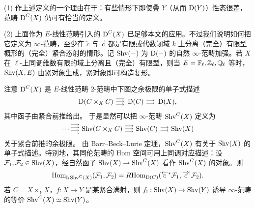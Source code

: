\begin{rmk}
\label{R: DC enh}
(1) 作上述定义的一个理由在于：有些情形下即使叠 $Y$（从而 $\operatorname{D}(Y)$）性态很差，范畴 $\operatorname{D}^C(X)$ 仍可有恰当的定义。

(2) 上面作为 $E$-线性范畴引入的 $\operatorname{D}^C(X)$ 已足够本文的应用。不过我们说明如何把它定义为 $\infty$-范畴，至少在 $\overleftarrow{c}$ 与 $\overrightarrow{c}$ 都是有限或代数闭域 $k$ 上分离（完全）有限型概形的（完全）紧合态射的情形。记 $\mathrm{Shv}(-)$ 为 $\operatorname{D}(-)$ 的自然 $\infty$-范畴加强。若 $X$ 在 $\ell$-上同调维数有限的域上分离且（完全）有限型，则当 $E={\mathbb F}_\ell,{\mathbb Z}_\ell, {\mathbb Q}_\ell$ 等时，$\mathrm{Shv}(X,E)$ 由紧对象生成，紧对象即可构造复形。

注意 $\operatorname{D}^C(X)$ 是 $E$-线性范畴 $2$-范畴中下图之余极限的单子式描述
\[\on{D}(C\times_XC)\ \substack{\longrightarrow\\[-1em] \longrightarrow \\[-1em] \longrightarrow}\ \on{D}(C)\ \substack{\longrightarrow\\[-1em] \longrightarrow} \ \on{D}(X),\]
其中函子由紧合前推给出。
于是显然可以把 $\infty$-范畴 $\mathrm{Shv}^C(X)$ 定义为
\[\cdots \substack{\longrightarrow\\[-1em] \longrightarrow \\[-1em] \longrightarrow\\[-1em] \longrightarrow}\ \Shv(C\times_XC)\ \substack{\longrightarrow\\[-1em] \longrightarrow \\[-1em] \longrightarrow}\ \Shv(C)\ \substack{\longrightarrow\\[-1em] \longrightarrow} \ \Shv(X)\]
关于紧合前推的余极限。
由 Barr–Beck–Lurie 定理，$\mathrm{Shv}^C(X)$ 有关于 $\mathrm{Shv}(X)$ 的单子式描述。特别地，其同伦范畴的 Hom 空间可用上同调对应描述：设 ${\mathcal F}_1,{\mathcal F}_2\in \mathrm{Shv}(X)$，经自然函子 $\mathrm{Shv}(X)\to \mathrm{Shv}^C(X)$ 看作 $\mathrm{Shv}^C(X)$ 的对象。则
$${\operatorname{Hom}}_{\operatorname{h}\mathrm{Shv}^C(X)}({\mathcal F}_1,{\mathcal F}_2)=R{\operatorname{Hom}}_{\operatorname{D}(C)}(\overleftarrow{c}^*{\mathcal F}_1,\overrightarrow{c}^!{\mathcal F}_2).$$
若 $C=X\times_YX$，$f:X\to Y$ 是某紧合满射，则 $f_!:\mathrm{Shv}(X)\to \mathrm{Shv}(Y)$ 诱导 $\infty$-范畴的等价 $\mathrm{Shv}^C(X)\simeq \mathrm{Shv}(Y)$。
\end{rmk}
